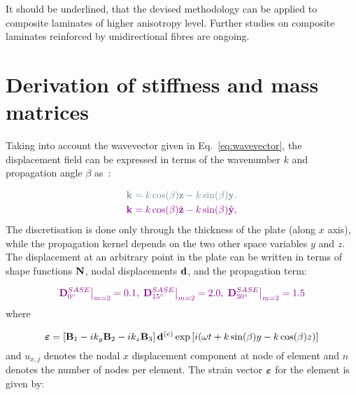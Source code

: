 	It should be underlined, that the devised methodology can be applied to composite laminates of higher anisotropy level. Further studies on composite laminates reinforced by unidirectional fibres are ongoing.
	 

	
	\appendix
	 
\section{Derivation of stiffness and mass matrices}
	 Taking into account the wavevector given in Eq.~\ref{eq:wavevector}, the 
	 displacement field can be expressed in terms of the wavenumber \(k\) and 
	 propagation angle \(\beta\) as~\cite{Taupin2011}:
	  
\begin{equation}
\begin{aligned}
\DIFdelmath{
	  \vect{k} = k \cos (\beta) \vect{z} - k \sin (\beta) \vect{y}.
	}\\
\DIFaddmath{
	  \vect{k} = k \cos (\beta)\hat{ \vect{z}} - k \sin (\beta) \hat{\vect{y}},
	}
\end{aligned}
\label{eq:wavevector}
\end{equation}
	 The discretisation is done only through the thickness of the plate (along \(x\) axis), 
	 while the propagation kernel depends on the two other space variables \(y\) and \(z\). 
	 The displacement at an arbitrary point in the plate can be written in terms of shape 
	 functions \(\mathbf{N}\), nodal displacements \(\mathbf{d}\), and the propagation term:
	 
\begin{equation}
\DIFaddmath{
\left. \matr{D}^{SASE}_{0^{\circ}}\right\vert_{m=2} = 0.1, \, \left. \matr{D}^{SASE}_{15^{\circ}}\right\vert_{m=2} = 2.0, \, \left. \matr{D}^{SASE}_{30^{\circ}}\right\vert_{m=2} = 1.5}
\label{eq:objective_fun_mod}
\end{equation}
	 where
	 
\begin{equation}
	 \boldsymbol{\varepsilon}= \left[ \mathbf{B}_1 -i k_y \mathbf{B}_2 -i k_z \mathbf{B}_3 \right] \mathbf{d}^{(e)} \exp \left[ i (\omega t + k \sin (\beta) y - k \cos (\beta) z)\right]
	 \end{equation}
	 and \(u_{x,j}\) denotes the nodal \(x\) displacement component at   node of 
	 element and \(n\) denotes the number of nodes per element.
	 The strain vector \(\boldsymbol{\varepsilon}\) for the element is given by:
	 
